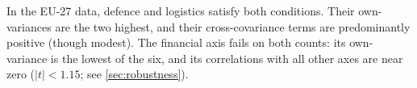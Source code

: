 \noindent
In the EU-27 data, defence and logistics satisfy both conditions.
Their own-variances are the two highest, and their cross-covariance
terms are predominantly positive (though modest).  The financial
axis fails on both counts: its own-variance is the lowest of the
six, and its correlations with all other axes are near zero
($|t| < 1.15$; see \cref{sec:robustness}).
